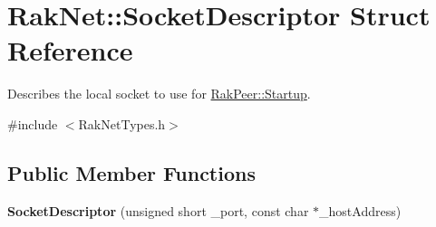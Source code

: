 \hypertarget{struct_rak_net_1_1_socket_descriptor}{\section{Rak\-Net\-:\-:Socket\-Descriptor Struct Reference}
\label{struct_rak_net_1_1_socket_descriptor}
}


Describes the local socket to use for \hyperlink{class_rak_net_1_1_rak_peer_a92d493cb617381a6e750f7df6e768927}{Rak\-Peer\-::\-Startup}.  




{\ttfamily \#include $<$Rak\-Net\-Types.\-h$>$}

\subsection*{Public Member Functions}
\begin{DoxyCompactItemize}
\item 
\hypertarget{struct_rak_net_1_1_socket_descriptor_adda763155cc88bf167958070616e3243}{{\bfseries Socket\-Descriptor} (unsigned short \-\_\-port, const char $\ast$\-\_\-host\-Address)}\label{struct_rak_net_1_1_socket_descriptor_adda763155cc88bf167958070616e3243}

\end{DoxyCompactItemize}
